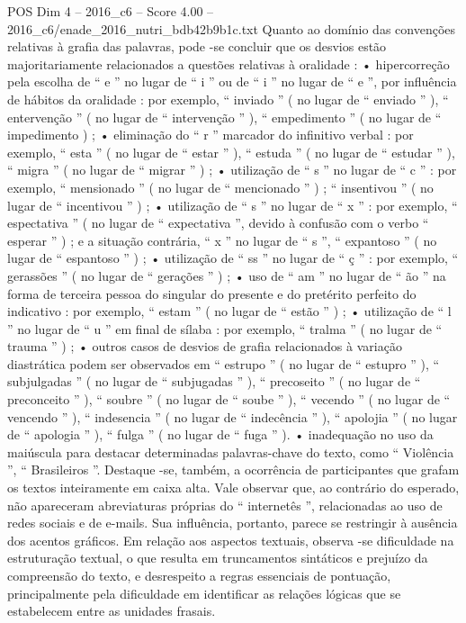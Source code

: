 \begin{textsample}{POS Dim 4 – 2016\_c6 – Score 4.00 – 2016\_c6/enade\_2016\_nutri\_bdb42b9b1c.txt}
Quanto ao domínio das convenções relativas à grafia das palavras, pode -se concluir que os desvios estão majoritariamente relacionados a questões relativas à oralidade : • hipercorreção pela escolha de “ e ” no lugar de “ i ” ou de “ i ” no lugar de “ e ”, por influência de hábitos da oralidade : por exemplo, “ inviado ” ( no lugar de “ enviado ” ), “ entervenção ” ( no lugar de “ intervenção ” ), “ empedimento ” ( no lugar de “ impedimento ) ; • eliminação do “ r ” marcador do infinitivo verbal : por exemplo, “ esta ” ( no lugar de “ estar ” ), “ estuda ” ( no lugar de “ estudar ” ), “ migra ” ( no lugar de “ migrar ” ) ; • utilização de “ s ” no lugar de “ c ” : por exemplo, “ mensionado ” ( no lugar de “ mencionado ” ) ; “ insentivou ” ( no lugar de “ incentivou ” ) ; • utilização de “ s ” no lugar de “ x ” : por exemplo, “ espectativa ” ( no lugar de “ expectativa ”, devido à confusão com o verbo “ esperar ” ) ; e a situação contrária, “ x ” no lugar de “ s ”, “ expantoso ” ( no lugar de “ espantoso ” ) ; • utilização de “ ss ” no lugar de “ ç ” : por exemplo, “ gerassões ” ( no lugar de “ gerações ” ) ; • uso de “ am ” no lugar de “ ão ” na forma de terceira pessoa do singular do presente e do pretérito perfeito do indicativo : por exemplo, “ estam ” ( no lugar de “ estão ” ) ; • utilização de “ l ” no lugar de “ u ” em final de sílaba : por exemplo, “ tralma ” ( no lugar de “ trauma ” ) ; • outros casos de desvios de grafia relacionados à variação diastrática podem ser observados em “ estrupo ” ( no lugar de “ estupro ” ), “ subjulgadas ” ( no lugar de “ subjugadas ” ), “ precoseito ” ( no lugar de “ preconceito ” ), “ soubre ” ( no lugar de “ soube ” ), “ vecendo ” ( no lugar de “ vencendo ” ), “ indesencia ” ( no lugar de “ indecência ” ), “ apolojia ” ( no lugar de “ apologia ” ), “ fulga ” ( no lugar de “ fuga ” ). • inadequação no uso da maiúscula para destacar determinadas palavras-chave do texto, como “ Violência ”, “ Brasileiros ”.
Destaque -se, também, a ocorrência de participantes que grafam os textos inteiramente em caixa alta.
Vale observar que, ao contrário do esperado, não apareceram abreviaturas próprias do “ internetês ”, relacionadas ao uso de redes sociais e de e-mails.
Sua influência, portanto, parece se restringir à ausência dos acentos gráficos.
Em relação aos aspectos textuais, observa -se dificuldade na estruturação textual, o que resulta em truncamentos sintáticos e prejuízo da compreensão do texto, e desrespeito a regras essenciais de pontuação, principalmente pela dificuldade em identificar as relações lógicas que se estabelecem entre as unidades frasais.

\end{textsample}

